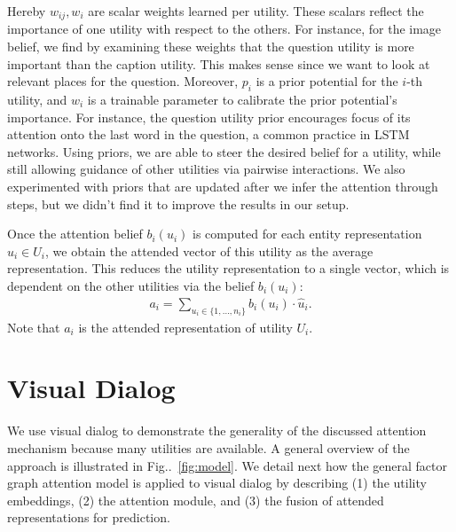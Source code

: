 \documentclass[10pt,twocolumn,letterpaper]{article}
\makeatletter
\newcommand{\beas}{\begin{eqnarray*}}
\newcommand{\eeas}{\end{eqnarray*}}
\def\@onedot{\ifx\@let@token.\else.\null\fi\xspace}
\DeclareRobustCommand\onedot{\futurelet\@let@token\@onedot}
\newcommand{\figref}[1]{Fig\onedot~\ref{#1}}
\makeatother
\begin{document}
Hereby $w_{ij}, w_i$ are scalar weights learned per utility. These scalars reflect the importance of one utility with respect to the others.  For instance,  for the image belief, we find by examining these weights that the question utility is more important  than the caption utility. This makes sense since we want to look at relevant places for the question. 
Moreover, $p_i$ is a prior potential for the $i$-th utility, and $\hat w_{i}$ is a trainable parameter to calibrate the prior potential's importance. For instance, the question utility prior encourages focus of its   attention onto the last word in the question, a common practice in LSTM networks.  Using priors, we are able to steer the desired belief for a utility, while still allowing guidance of other utilities via pairwise interactions. We also experimented with priors that are updated after we infer the attention through steps, but we didn't find it to improve the results in our setup.  












Once the attention belief $b_i(u_i)$  is computed for each entity representation $\hat u_i\in U_i$, we obtain the attended vector of this utility as the average representation. This reduces the utility representation to a single vector, which is dependent on the other utilities via the belief $b_i(u_i)$: \beas
 a_i = \sum_{u_i \in \{1, \ldots, n_i\}} b_i(u_i)\cdot \hat u_i.
 \eeas
Note that $a_i$ is the attended representation of utility $U_i$. 







\section{Visual Dialog}
\label{sec:visdial}
We use visual dialog to demonstrate the generality of the discussed attention mechanism because many utilities are available. A general overview of the approach is illustrated in \figref{fig:model}. 
We  detail next how the general factor graph attention model is applied to visual dialog by describing (1) the utility embeddings, (2) the attention module, and (3) the fusion of attended representations for prediction.  
\end{document}
